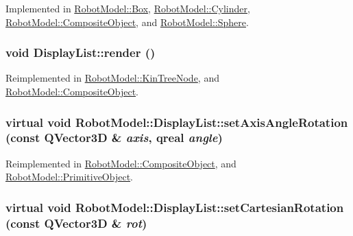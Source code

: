 Implemented in \hyperlink{class_robot_model_1_1_box_a29420d81c8b3622c95a1976593e2cc4b}{RobotModel::Box}, \hyperlink{class_robot_model_1_1_cylinder_a9f0361117d5f20344f543c9e20df1113}{RobotModel::Cylinder}, \hyperlink{class_robot_model_1_1_composite_object_a5aa475cb09f0e9b9089a941848f9e189}{RobotModel::CompositeObject}, and \hyperlink{class_robot_model_1_1_sphere_a838b5ae4f743aabe24a255dd61d2843c}{RobotModel::Sphere}.\hypertarget{class_robot_model_1_1_display_list_a5f95e85c192a2bc8f06f18075e6fefd7}{
\subsubsection[{render}]{\setlength{\rightskip}{0pt plus 5cm}void DisplayList::render ()}}
\label{class_robot_model_1_1_display_list_a5f95e85c192a2bc8f06f18075e6fefd7}


Reimplemented in \hyperlink{class_robot_model_1_1_kin_tree_node_a85f4364980f9144471b9d92e175c539e}{RobotModel::KinTreeNode}, and \hyperlink{class_robot_model_1_1_composite_object_aee43da74b22f6272736844effe7a1dd6}{RobotModel::CompositeObject}.\hypertarget{class_robot_model_1_1_display_list_a56a652740c494995c0ff55d1a5fd896d}{
\subsubsection[{setAxisAngleRotation}]{\setlength{\rightskip}{0pt plus 5cm}virtual void RobotModel::DisplayList::setAxisAngleRotation (const QVector3D \& {\em axis}, \/  qreal {\em angle})}}
\label{class_robot_model_1_1_display_list_a56a652740c494995c0ff55d1a5fd896d}


Reimplemented in \hyperlink{class_robot_model_1_1_composite_object_a43f99ed52def7114d310e29fc6db83f3}{RobotModel::CompositeObject}, and \hyperlink{class_robot_model_1_1_primitive_object_a3ae3782ae64f5fc07f4d18646e04ed21}{RobotModel::PrimitiveObject}.\hypertarget{class_robot_model_1_1_display_list_a7d52ea010f54755bcb3bfae9e26dd0c2}{
\subsubsection[{setCartesianRotation}]{\setlength{\rightskip}{0pt plus 5cm}virtual void RobotModel::DisplayList::setCartesianRotation (const QVector3D \& {\em rot})}}
\label{class_robot_model_1_1_display_list_a7d52ea010f54755bcb3bfae9e26dd0c2}


